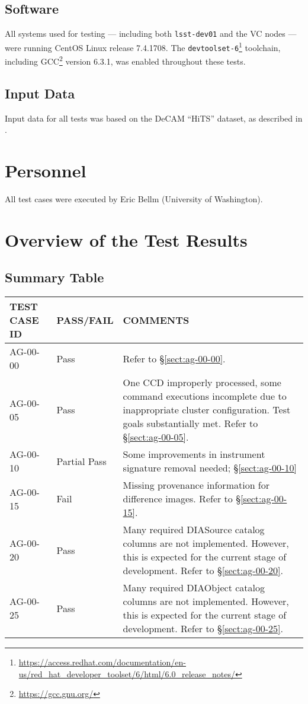 \documentclass[DM,STR,toc]{lsstdoc}
\begin{document}
\subsection{Software}
\label{sect:swconf}

All systems used for testing --- including both \texttt{lsst-dev01} and the VC nodes --- were running CentOS Linux release 7.4.1708.
The \texttt{devtoolset-6}\footnote{\url{https://access.redhat.com/documentation/en-us/red_hat_developer_toolset/6/html/6.0_release_notes/}} toolchain, including GCC\footnote{\url{https://gcc.gnu.org/}} version 6.3.1, was enabled throughout these tests.

\subsection{Input Data}
\label{sect:inputdata}

Input data for all tests was based on the DeCAM “HiTS” dataset, as described in .

\section{Personnel}
\label{sect:personnel}

All test cases were executed by Eric Bellm (University of Washington).

\newpage

\section{Overview of the Test Results}
\label{sect:overview}

\subsection{Summary Table}
\label{sect:summarytable}

\begin{longtable} {|p{}|p{}|p{}|}\hline
{\bf TEST CASE ID} & {\bf PASS/FAIL} & {\bf COMMENTS} \\\hline
AG-00-00 & Pass & Refer to \S\ref{sect:ag-00-00}. \\\hline
AG-00-05 & Pass & One CCD improperly processed, some command executions incomplete due to inappropriate cluster configuration. Test goals substantially met. Refer to \S\ref{sect:ag-00-05}. \\\hline
AG-00-10 & Partial Pass & Some improvements in instrument signature removal needed; \S\ref{sect:ag-00-10} \\\hline
AG-00-15 & Fail & Missing provenance information for difference images. Refer to \S\ref{sect:ag-00-15}. \\\hline
AG-00-20 & Pass & Many required DIASource catalog columns are not implemented. However, this is expected for the current stage of development. Refer to \S\ref{sect:ag-00-20}. \\\hline
AG-00-25 & Pass & Many required DIAObject catalog columns are not implemented. However, this is expected for the current stage of development. Refer to \S\ref{sect:ag-00-25}. \\\hline
\end{longtable}
\end{document}
